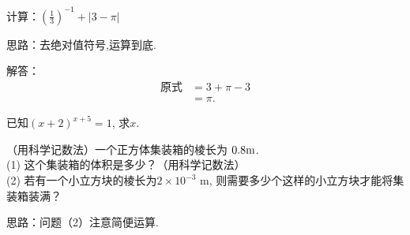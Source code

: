 \item{
    计算：$ (\frac{1}{3})^{-1} + \lvert 3-\pi \rvert $
    
    \fangsong{}
    思路：去绝对值符号,运算到底.

    解答：
    \begin{align*}
        \mbox{原式} &= 3 + \pi - 3\\
        &= \pi.
    \end{align*}
}
\item{
    已知$(x+2)^{x+5}=1$, 求$x$.
}
\item{
    （用科学记数法）一个正方体集装箱的棱长为 $0.8 \rm{m}$.\\
    (1) 这个集装箱的体积是多少？（用科学记数法）\\
    (2) 若有一个小立方块的棱长为$2\times 10^{-3} $ m, 则需要多少个这样的小立方块才能将集装箱装满？

    \fangsong{}
    思路：问题（2）注意简便运算.
}
